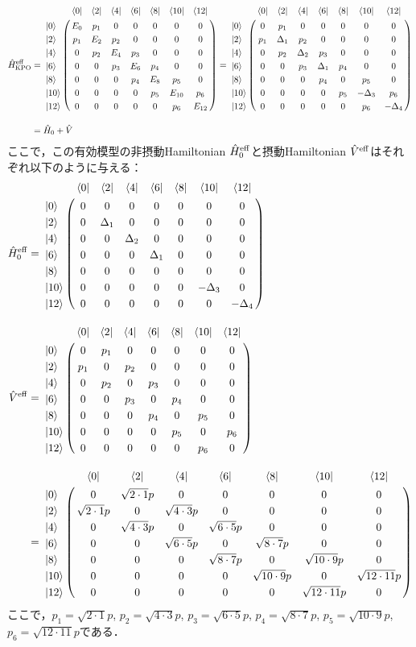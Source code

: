 \begin{align}
     \hat{H}_{\rm{KPO}}^{\rm{eff}}&=
   \bordermatrix{     
    & \bra{0} &  \bra{2} &  \bra{4}&  \bra{6}&  \bra{8} &\bra{10} &\bra{12}\cr
   \ket{0}&E_0&p_1&0&0&0&0&0\cr
  \ket{2}&p_1&E_2&p_2&0&0&0&0\cr
  \ket{4}&0&p_2&E_4&p_3&0&0&0\cr
  \ket{6}&0&0&p_3&E_6&p_4&0&0\cr
  \ket{8}&0&0&0&p_4&E_8&p_5&0\cr
  \ket{10}&0&0&0&0&p_5&E_{10}&p_6\cr
  \ket{12}&0&0&0&0&0&p_6&E_{12}\cr
            }
    =
   \bordermatrix{     
    & \bra{0} &  \bra{2} &  \bra{4}&  \bra{6}&  \bra{8} &\bra{10} &\bra{12}\cr
   \ket{0}&0&p_1&0&0&0&0&0\cr
  \ket{2}&p_1&\Delta_1&p_2&0&0&0&0\cr
  \ket{4}&0&p_2&\Delta_2&p_3&0&0&0\cr
  \ket{6}&0&0&p_3&\Delta_1&p_4&0&0\cr
  \ket{8}&0&0&0&p_4&0&p_5&0\cr
  \ket{10}&0&0&0&0&p_5&-\Delta_3&p_6\cr
  \ket{12}&0&0&0&0&0&p_6&-\Delta_4\cr
            }\nn[10pt]
    &=\hat{H}_0 + \hat{V} 
\end{align}
ここで，この有効模型の非摂動Hamiltonian $\hat{H}_0^{\rm{eff}}$と摂動Hamiltonian $\hat{V}^{\rm{eff}}$はそれぞれ以下のように与える：
\begin{align}
    \hat{H}_0^{\rm{eff}}&=\bordermatrix{
    & \bra{0} &  \bra{2} &  \bra{4}&  \bra{6}&  \bra{8} &\bra{10} &\bra{12}\cr
   \ket{0}&0&0&0&0&0&0&0\cr
  \ket{2}&0&\Delta_1&0&0&0&0&0\cr
  \ket{4}&0&0&\Delta_2&0&0&0&0\cr
  \ket{6}&0&0&0&\Delta_1&0&0&0\cr
  \ket{8}&0&0&0&0&0&0&0\cr
  \ket{10}&0&0&0&0&0&-\Delta_3&0\cr
  \ket{12}&0&0&0&0&0&0&-\Delta_4\cr}\nn[10pt]
  \hat{V}^{\rm{eff}}&=
   \bordermatrix{     
    & \bra{0} &  \bra{2} &  \bra{4}&  \bra{6}&  \bra{8} &\bra{10} &\bra{12}\cr
   \ket{0}&0&p_1&0&0&0&0&0\cr
  \ket{2}&p_1&0&p_2&0&0&0&0\cr
  \ket{4}&0&p_2&0&p_3&0&0&0\cr
  \ket{6}&0&0&p_3&0&p_4&0&0\cr
  \ket{8}&0&0&0&p_4&0&p_5&0\cr
  \ket{10}&0&0&0&0&p_5&0&p_6\cr
  \ket{12}&0&0&0&0&0&p_6&0\cr}\\[10pt]
    &=
   \bordermatrix{     
    & \bra{0} &  \bra{2} &  \bra{4}&  \bra{6}&  \bra{8} &\bra{10} &\bra{12}\cr
   \ket{0}&0&\sqrt{2\cdot1}p&0&0&0&0&0\cr
  \ket{2}&\sqrt{2\cdot1}p&0&\sqrt{4\cdot3}p&0&0&0&0\cr
  \ket{4}&0&\sqrt{4\cdot3}p&0&\sqrt{6\cdot5}p&0&0&0\cr
  \ket{6}&0&0&\sqrt{6\cdot5}p&0&\sqrt{8\cdot7}p&0&0\cr
  \ket{8}&0&0&0&\sqrt{8\cdot7}p&0&\sqrt{10\cdot9}p&0\cr
  \ket{10}&0&0&0&0&\sqrt{10\cdot9}p&0&\sqrt{12\cdot11}p\cr
  \ket{12}&0&0&0&0&0&\sqrt{12\cdot11}p&0\cr
            }
\end{align}
ここで，$p_1=\sqrt{2\cdot1}p$, $p_2=\sqrt{4\cdot3}p$, $p_3=\sqrt{6\cdot5}p$, $p_4=\sqrt{8\cdot7}p$, $p_5=\sqrt{10\cdot9}p$, $p_6=\sqrt{12\cdot11}p$である．



